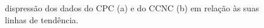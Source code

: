 \begin{figure}[!htbp]%
\centering
{} \qquad
{} \qquad
\centering \caption{ dispress\~{a}o dos dados do CPC (a) e do CCNC (b) em rela\c{c}\~{a}o \`{a}s suas linhas de tend\^{e}ncia.}
\label{hsterro}
\end{figure}



